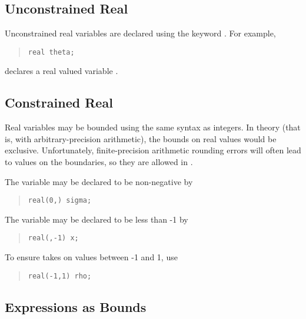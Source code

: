 \subsection{Unconstrained Real}

Unconstrained real variables are declared using the keyword
.  For example,
%
\begin{quote}
\begin{Verbatim}
real theta;
\end{Verbatim}
\end{quote}
%
declares a real valued variable .

\subsection{Constrained Real}

Real variables may be bounded using the same syntax as integers.  In
theory (that is, with arbitrary-precision arithmetic), the bounds on
real values would be exclusive.  Unfortunately, finite-precision
arithmetic rounding errors will often lead to values on the
boundaries, so they are allowed in \Stan.
 
The variable  may be declared to be non-negative by
%
\begin{quote}
\begin{Verbatim}
real(0,) sigma;
\end{Verbatim}
\end{quote}
%
The variable  may be declared to be less than -1 by
%
\begin{quote}
\begin{Verbatim} 
real(,-1) x;
\end{Verbatim}
\end{quote}
% 
To ensure  takes on values between -1 and 1, use
%
\begin{quote}
\begin{Verbatim}
real(-1,1) rho;
\end{Verbatim}
\end{quote}
%


\subsection{Expressions as Bounds}

